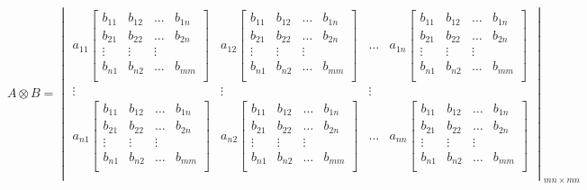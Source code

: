 $$
A \otimes B = \begin{vmatrix}
a_{11} 
\begin{bmatrix}
b_{11} & b_{12} & \ldots & b_{1n} \\
b_{21} & b_{22} & \ldots & b_{2n} \\
\vdots & \vdots & \vdots & \\
b_{n1} & b_{n2} & \ldots & b_{mm} \\
\end{bmatrix}
& a_{12} 
\begin{bmatrix}
b_{11} & b_{12} & \ldots & b_{1n} \\
b_{21} & b_{22} & \ldots & b_{2n} \\
\vdots & \vdots & \vdots & \\
b_{n1} & b_{n2} & \ldots & b_{mm} \\
\end{bmatrix}
& \ldots & a_{1n}
\begin{bmatrix}
b_{11} & b_{12} & \ldots & b_{1n} \\
b_{21} & b_{22} & \ldots & b_{2n} \\
\vdots & \vdots & \vdots & \\
b_{n1} & b_{n2} & \ldots & b_{mm} \\
\end{bmatrix}
\\
\vdots & \vdots & \vdots & \\
a_{n1} 
\begin{bmatrix}
b_{11} & b_{12} & \ldots & b_{1n} \\
b_{21} & b_{22} & \ldots & b_{2n} \\
\vdots & \vdots & \vdots & \\
b_{n1} & b_{n2} & \ldots & b_{mm} \\
\end{bmatrix}
& a_{n2} 
\begin{bmatrix}
b_{11} & b_{12} & \ldots & b_{1n} \\
b_{21} & b_{22} & \ldots & b_{2n} \\
\vdots & \vdots & \vdots & \\
b_{n1} & b_{n2} & \ldots & b_{mm} \\
\end{bmatrix}
& \ldots & a_{nn}
\begin{bmatrix}
b_{11} & b_{12} & \ldots & b_{1n} \\
b_{21} & b_{22} & \ldots & b_{2n} \\
\vdots & \vdots & \vdots & \\
b_{n1} & b_{n2} & \ldots & b_{mm} \\
\end{bmatrix}
\\
\end{vmatrix}_{mn \times mn}
$$

